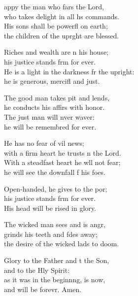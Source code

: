 \settowidth{\versewidth}{He is a light in the darkness for the upright: *}
\begin{psalmverse}%
  \begin{patverse}
appy the man who fars the Lord,\Med\\
who takes delight in all h\pointup{\i}s commands.\\
His sons shall be powerfl on earth;\Med\\
the children of the upr\pointup{\i}ght are blessed.

Riches and wealth are \pointup{\i}n his house;\Med\\
his justice stands f\pointup{\i}rm for ever.\\
He is a light in the darkness fr the upright:\Med\\
he is generous, mercifl and just.

The good man takes pit and lends,\Med\\
he conducts his affirs with honor.\\
The just man will nver waver:\Med\\
he will be remembred for ever.

He has no fear of vil news;\Med\\
with a firm heart he trusts \pointup{\i}n the Lord.\\
With a steadfast heart he w\pointup{\i}ll not fear;\Med\\
he will see the downfall f his foes.

Open-handed, he gives to the por;\Flex\\
his justice stands f\pointup{\i}rm for ever.\Med\\
His head will be rised in glory.

The wicked man sees and is angr,\Flex\\
grinds his teeth and fdes away;\Med\\
the desire of the wicked lads to doom.

Glory to the Father and t the Son,\Med\\
and to the Hly Spirit:\\
as it was in the beginn\pointup{\i}ng, is now,\Med\\
and will be forevr. Amen. 
  \end{patverse}
\end{psalmverse}
